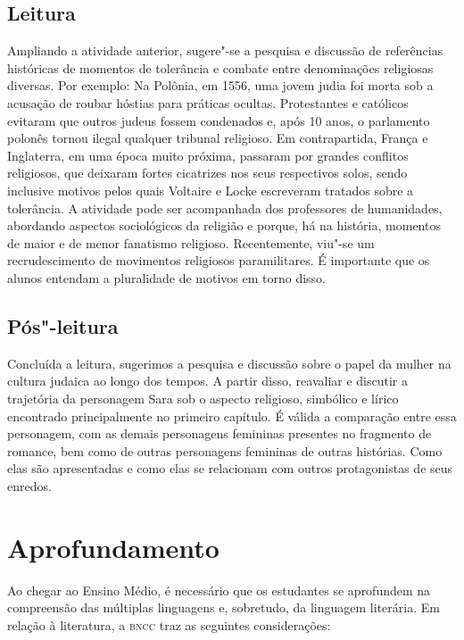 \documentclass[12pt]{extarticle}
\begin{document}
\subsection{Leitura}

Ampliando a atividade anterior, sugere"-se a pesquisa e
discussão de referências históricas de momentos de tolerância e combate
entre denominações religiosas diversas. Por exemplo: Na Polônia, em
1556, uma jovem judia foi morta sob a acusação de roubar hóstias para
práticas ocultas. Protestantes e católicos evitaram que outros judeus
fossem condenados e, após 10 anos, o parlamento polonês tornou ilegal
qualquer tribunal religioso. Em contrapartida, França e Inglaterra, em
uma época muito próxima, passaram por grandes conflitos religiosos, que
deixaram fortes cicatrizes nos seus respectivos solos, sendo inclusive
motivos pelos quais Voltaire e Locke escreveram tratados sobre a
tolerância. A atividade pode ser acompanhada dos professores de
humanidades, abordando aspectos sociológicos da religião e porque, há na
história, momentos de maior e de menor fanatismo religioso.
Recentemente, viu"-se um recrudescimento de movimentos religiosos
paramilitares. É importante que os alunos entendam a pluralidade de
motivos em torno disso.

\subsection{Pós"-leitura}

Concluída a leitura, sugerimos a pesquisa e discussão sobre
o papel da mulher na cultura judaica ao longo dos tempos. A partir
disso, reavaliar e discutir a trajetória da personagem Sara sob o
aspecto religioso, simbólico e lírico encontrado principalmente no
primeiro capítulo. É válida a comparação entre essa personagem, com as
demais personagens femininas presentes no fragmento de romance, bem como
de outras personagens femininas de outras histórias. Como elas são
apresentadas e como elas se relacionam com outros protagonistas de seus
enredos.

\section{Aprofundamento}

Ao chegar ao Ensino Médio, é necessário que os estudantes se aprofundem
na compreensão das múltiplas linguagens e, sobretudo, da linguagem
literária. Em relação à literatura, a \textsc{bncc} traz as seguintes
considerações:
\end{document}
